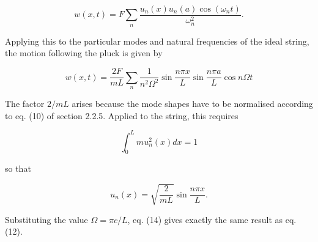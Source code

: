   \begin{equation*}w(x,t)= F \sum_n{\frac{u_n(x) u_n(a) \cos(\omega_n 
  t)}{\omega_n^2}}. \tag{13}\end{equation*} 

  Applying this to the particular modes and natural frequencies of the ideal 
  string, the motion following the pluck is given by 

  \begin{equation*}w(x,t)= \frac{2F}{mL} \sum_n{\frac{1}{ n^2 \Omega^2} \sin 
  \frac{n \pi x}{L} \sin \frac{n \pi a}{L} \cos n \Omega t} 
  \tag{14}\end{equation*} 

  The factor $2/mL$ arises because the mode shapes have to be normalised 
  according to eq. (10) of section 2.2.5. Applied to the string, this requires 

  \begin{equation*}\int_0^L{m u_n^2(x) dx}=1 \tag{15}\end{equation*} 

  \noindent{}so that 

  \begin{equation*}u_n(x) = \sqrt{\frac{2}{mL}} \sin \frac{n \pi x}{L}. 
  \tag{16}\end{equation*} 

  Substituting the value $\Omega= \pi c/L$, eq. (14) gives exactly the same 
  result as eq. (12). 
